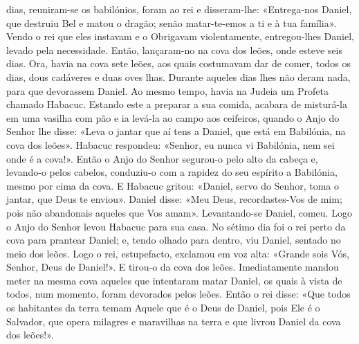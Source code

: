 \begin{paracol}{2}
{ dias, reuniram-se os babilónios, foram ao rei e disseram-lhe: «Entrega-nos Daniel, que destruiu Bel e matou o dragão; senão matar-te-emos a ti e à tua família». Vendo o rei que eles instavam e o Obrigavam violentamente, entregou-lhes Daniel, levado pela necessidade. Então, lançaram-no na cova dos leões, onde esteve seis dias. Ora, havia na cova sete leões, aos quais costumavam dar de comer, todos os dias, dous cadáveres e duas oves lhas. Durante aqueles dias lhes não deram nada, para que devorassem Daniel. Ao mesmo tempo, havia na Judeia um Profeta chamado Habacuc. Estando este a preparar a sua comida, acabara de misturá-la em uma vasilha com pão e ia levá-la ao campo aos ceifeiros, quando o Anjo do Senhor lhe disse: «Leva o jantar que aí tens a Daniel, que está em Babilónia, na cova dos leões». Habacuc respondeu: «Senhor, eu nunca vi Babilónia, nem sei onde é a cova!». Então o Anjo do Senhor segurou-o pelo alto da cabeça e, levando-o pelos cabelos, conduziu-o com a rapidez do seu espírito a Babilónia, mesmo por cima da cova. E Habacuc gritou: «Daniel, servo do Senhor, toma o jantar, que Deus te enviou». Daniel disse: «Meu Deus, recordastes-Vos de mim; pois não abandonais aqueles que Vos amam». Levantando-se Daniel, comeu. Logo o Anjo do Senhor levou Habacuc para sua casa. No sétimo dia foi o rei perto da cova para prantear Daniel; e, tendo olhado para dentro, viu Daniel, sentado no meio dos leões. Logo o rei, estupefacto, exclamou em voz alta: «Grande sois Vós, Senhor, Deus de Daniel!». E tirou-o da cova dos leões. Imediatamente mandou meter na mesma cova aqueles que intentaram matar Daniel, os quais à vista de todos, num momento, foram devorados pelos leões. Então o rei disse: «Que todos os habitantes da terra temam Aquele que é o Deus de Daniel, pois Ele é o Salvador, que opera milagres e maravilhas na terra e que livrou Daniel da cova dos leões!».
}\end{paracol}

\begin{paracol}{2}\switchcolumn{}\end{paracol}

